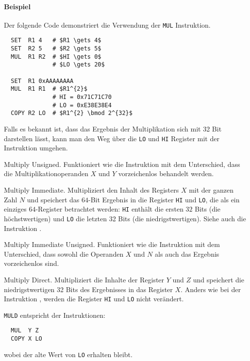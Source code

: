 \paragraph{Beispiel} Der folgende Code demonstriert die Verwendung der
\texttt{MUL} Instruktion.
\begin{lstlisting}
  SET  R1 4   # $R1 \gets 4$
  SET  R2 5   # $R2 \gets 5$
  MUL  R1 R2  # $HI \gets 0$
              # $LO \gets 20$

  SET  R1 0xAAAAAAAA
  MUL  R1 R1  # $R1^{2}$
              # HI = 0x71C71C70
              # LO = 0xE38E38E4 
  COPY R2 LO  # $R1^{2} \bmod 2^{32}$ 
\end{lstlisting}
Falls es bekannt ist, dass das Ergebnis der Multiplikation sich mit 32 Bit
darstellen lässt, kann man den Weg über die \texttt{LO} und \texttt{HI} Register
mit der Instruktion  umgehen.




\glqq Multiply Unsigned\grqq.
Funktioniert wie die Instruktion  mit dem Unterschied, dass die
Multiplikationoperanden $X$ und $Y$ vorzeichenlos behandelt werden. 



\glqq Multiply Immediate\grqq.
Multipliziert den Inhalt des Registers $X$ mit der ganzen Zahl $N$ und speichert
das $64$-Bit Ergebnis in die Register \texttt{HI} und \texttt{LO}, die als ein
einziges $64$-Register betrachtet werden: \texttt{HI} enthält die ersten $32$
Bits (die höchstwertigen) und \texttt{LO} die letzten 32 Bits (die
niedrigstwertigen).
Siehe auch die Instruktion .


\glqq Multiply Immediate Unsigned\grqq.
Funktioniert wie die Instruktion  mit dem Unterschied, dass sowohl
die Operanden $X$ und $N$ als auch das Ergebnis vorzeichenlos sind.


\glqq Multiply Direct\grqq.
Multipliziert die Inhalte der Register $Y$ und $Z$ und speichert die
niedrigstwertigen 32 Bits des Ergebnisses in das Register $X$. Anders wie bei
der Instruktion , werden die Register \texttt{HI} und \texttt{LO}
nicht verändert.

\texttt{MULD} entspricht der Instruktionen:
\begin{lstlisting}
  MUL  Y Z
  COPY X LO
\end{lstlisting}
wobei der alte Wert von \texttt{LO} erhalten bleibt.


